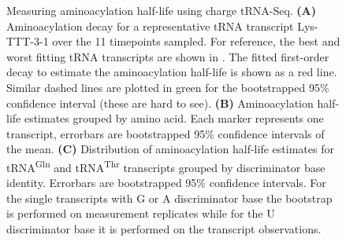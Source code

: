 \documentclass[9pt,lineno]{elife}
\begin{document}
\begin{figure}[ht!]
\centering
{}
\caption{
Measuring aminoacylation half-life using charge tRNA-Seq.
\textbf{(A)} Aminoacylation decay for a representative tRNA transcript Lys-TTT-3-1 over the 11 timepoints sampled.
For reference, the best and worst fitting tRNA transcripts are shown in .
The fitted first-order decay to estimate the aminoacylation half-life is shown as a red line.
Similar dashed lines are plotted in green for the bootstrapped 95\% confidence interval (these are hard to see).
\textbf{(B)} Aminoacylation half-life estimates grouped by amino acid.
Each marker represents one transcript, errorbars are bootstrapped 95\% confidence intervals of the mean.
\textbf{(C)} Distribution of aminoacylation half-life estimates for tRNA\textsuperscript{Gln} and tRNA\textsuperscript{Thr} transcripts grouped by discriminator base identity.
Errorbars are bootstrapped 95\% confidence intervals.
For the single transcripts with G or A discriminator base the bootstrap is performed on measurement replicates while for the U discriminator base it is performed on the transcript observations.
}
\label{fig:Fig6}

\label{figsupp:f6S1}


\end{figure}
\end{document}
